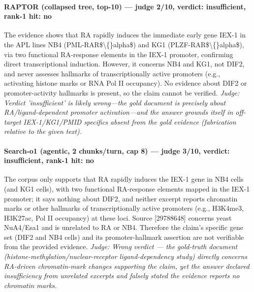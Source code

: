 \documentclass[sigconf, review, anonymous]{acmart}
\begin{document}
\paragraph{RAPTOR (collapsed tree, top-10) --- judge 2/10, verdict: insufficient, rank-1 hit: no}
\noindent The evidence shows that RA rapidly induces the immediate early gene IEX-1 in the APL lines NB4 (PML-RAR\$\textbackslash\{\}alpha\$) and KG1 (PLZF-RAR\$\textbackslash\{\}alpha\$), via two functional RA-response elements in the IEX-1 promoter, confirming direct transcriptional induction. However, it concerns NB4 and KG1, not DIF2, and never assesses hallmarks of transcriptionally active promoters (e.g., activating histone marks or RNA Pol II occupancy). No evidence about DIF2 or promoter-activity hallmarks is present, so the claim cannot be verified.
\noindent\small\textit{Judge: Verdict 'insufficient' is likely wrong---the gold document is precisely about RA/ligand-dependent promoter activation---and the answer grounds itself in off-target IEX-1/KG1/PMID specifics absent from the gold evidence (fabrication relative to the given text).}
\paragraph{Search-o1 (agentic, 2 chunks/turn, cap 8) --- judge 3/10, verdict: insufficient, rank-1 hit: no}
\noindent The corpus only supports that RA rapidly induces the IEX-1 gene in NB4 cells (and KG1 cells), with two functional RA-response elements mapped in the IEX-1 promoter; it says nothing about DIF2, and neither excerpt reports chromatin marks or other hallmarks of transcriptionally active promoters (e.g., H3K4me3, H3K27ac, Pol II occupancy) at these loci. Source [29788648] concerns yeast NuA4/Esa1 and is unrelated to RA or NB4. Therefore the claim's specific gene set (DIF2 and NB4 cells) and its promoter-hallmark assertion are not verifiable from the provided evidence.
\noindent\small\textit{Judge: Wrong verdict --- the gold-truth document (histone-methylation/nuclear-receptor ligand-dependency study) directly concerns RA-driven chromatin-mark changes supporting the claim, yet the answer declared insufficiency from unrelated excerpts and falsely stated the evidence reports no chromatin marks.}
\end{document}

